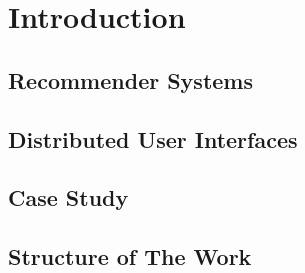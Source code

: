 \chapter{Introduction}\label{chapter:introduction}

\section{Recommender Systems}
\section{Distributed User Interfaces}
\section{Case Study}
\section{Structure of The Work}